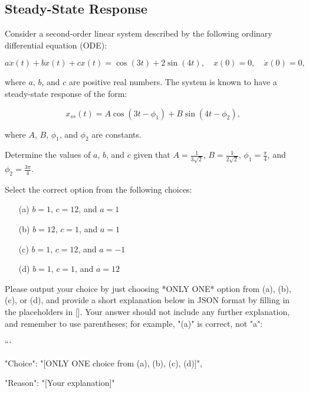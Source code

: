 \documentclass[12pt]{article}
\begin{document}
\subsection{Steady-State Response}

Consider a second-order linear system described by the following ordinary differential equation (ODE):

            \begin{equation*}
                a\ddot{x}(t) + b\dot{x}(t) + cx(t) = \cos(3t) + 2\sin(4t), \quad x(0) = 0, \quad \dot{x}(0) = 0,
            \end{equation*}
            
            where \( a \), \( b \), and \( c \) are positive real numbers. The system is known to have a steady-state response of the form:

            \begin{equation*}
                x_{ss}(t) = A\cos(3t - \phi_1) + B\sin(4t - \phi_2),
            \end{equation*}
            
            where \( A \), \( B \), \( \phi_1 \), and \( \phi_2 \) are constants.
            
            Determine the values of \( a \), \( b \), and \( c \) given that \( A = \frac{1}{3\sqrt{2}} \), \( B = \frac{1}{2\sqrt{2}} \), \( \phi_1 = \frac{\pi}{4} \), and \( \phi_2 = \frac{3\pi}{4} \).

Select the correct option from the following choices:
\begin{enumerate}
    \item [(a)] \( b = 1 \), \( c = 12 \), and \( a = 1 \)
    \item [(b)] \( b = 12 \), \( c = 1 \), and \( a = 1 \)
    \item [(c)] \( b = 1 \), \( c = 12 \), and \( a = -1 \)
    \item [(d)] \( b = 1 \), \( c = 1 \), and \( a = 12 \)
\end{enumerate}

Please output your choice by just choosing *ONLY ONE* option from (a), (b), (c), or (d), and provide a short explanation below in JSON format by filling in the placeholders in []. Your answer should not include any further explanation, and remember to use parentheses; for example, "(a)" is correct, not "a": 

```
{

"Choice": "[ONLY ONE choice from (a), (b), (c), (d)]",

"Reason": "[Your explanation]"

}
\end{document}
